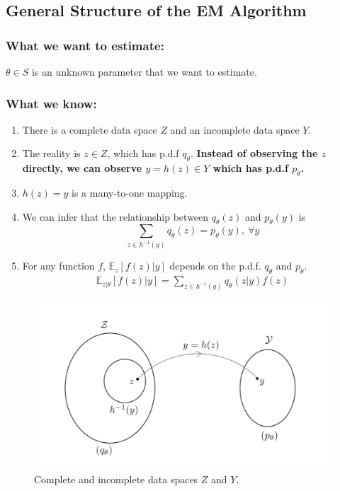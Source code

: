 \documentclass[11pt,a4paper]{article}
\begin{document}
\subsection{General Structure of the EM Algorithm}

\subsubsection*{What we want to estimate:}
$\theta\in S$ is an unknown parameter that we want to estimate.
\subsubsection*{What we know:}
\begin{enumerate}
    \item There is a complete data space $Z$ and an incomplete data space $Y$.
    \item The reality is $z\in Z$, which has p.d.f $q_{\theta}$. \textbf{Instead of observing the $z$ directly, we can observe $y=h(z)\in Y$ which has p.d.f $p_{\theta}$.}
    \item $h(z)=y$ is a many-to-one mapping.
    \item We can infer that the relationship between $q_\theta(z)$ and $p_\theta(y)$ is $$\sum_{z\in h^{-1}(y)}q_\theta(z)=p_\theta(y),\ \forall y$$
    \item For any function $f$, $\mathbb{E}_z[f(z)|y]$ depends on the p.d.f. $q_\theta$ and $p_\theta$. \begin{equation}
        \begin{aligned}
            \mathbb{E}_{z|\theta}[f(z)|y]=\sum_{z\in h^{-1}(y)}q_\theta(z|y)f(z)
        \end{aligned}
        \nonumber
    \end{equation}
\end{enumerate}
\begin{center}\begin{figure}[htbp]
    \centering
    \includegraphics[scale=0.2]{EM1.png}
    \caption{Complete and incomplete data spaces $Z$ and $Y$.}
    \label{}
\end{figure}\end{center}
\end{document}
